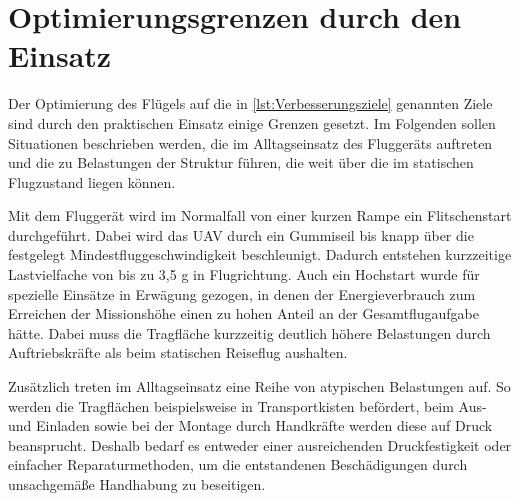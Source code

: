 \section{Optimierungsgrenzen durch den Einsatz}

Der Optimierung des Flügels auf die in \ref{lst:Verbesserungsziele} genannten Ziele sind durch den praktischen Einsatz einige Grenzen gesetzt.
Im Folgenden sollen Situationen beschrieben werden, die im Alltagseinsatz des Fluggeräts auftreten und die zu Belastungen der Struktur führen, die weit über die im statischen Flugzustand  liegen können. 

Mit dem Fluggerät wird im Normalfall von einer kurzen Rampe ein Flitschenstart durchgeführt. Dabei wird das UAV durch ein Gummiseil bis knapp über die festgelegt Mindestfluggeschwindigkeit beschleunigt. Dadurch entstehen kurzzeitige Lastvielfache von bis zu 3,5 g in Flugrichtung.
Auch ein Hochstart wurde für spezielle Einsätze in Erwägung gezogen, in denen der Energieverbrauch zum Erreichen der Missionshöhe einen zu hohen Anteil an der Gesamtflugaufgabe hätte. 
Dabei muss die Tragfläche kurzzeitig deutlich höhere Belastungen durch  Auftriebskräfte als beim statischen Reiseflug aushalten. 

Zusätzlich treten im Alltagseinsatz eine Reihe von atypischen Belastungen auf. So werden die Tragflächen beispielsweise in Transportkisten befördert, beim Aus- und Einladen sowie bei der Montage durch Handkräfte werden diese auf Druck beansprucht. Deshalb bedarf es entweder einer ausreichenden Druckfestigkeit oder einfacher Reparaturmethoden, um die entstandenen Beschädigungen durch unsachgemäße Handhabung zu beseitigen. 
